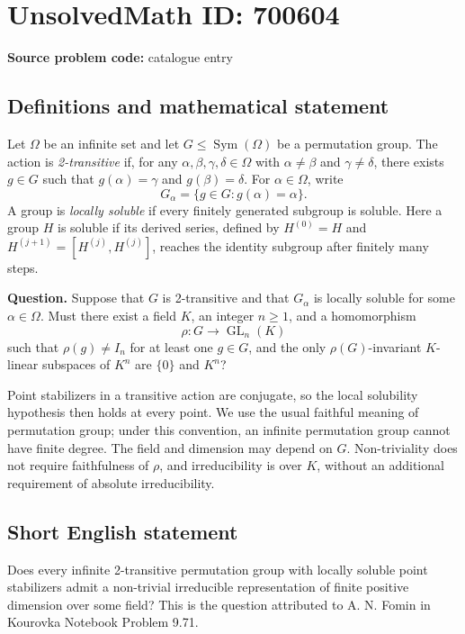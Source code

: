 \documentclass[11pt]{article}
\begin{document}
\section*{UnsolvedMath ID: 700604}
\textbf{Source problem code:} catalogue entry
\subsection{Definitions and mathematical statement}
Let \(\Omega\) be an infinite set and let \(G\leq\operatorname{Sym}(\Omega)\) be a permutation group. The action is \emph{2-transitive} if, for any \(\alpha,\beta,\gamma,\delta\in\Omega\) with \(\alpha\neq\beta\) and \(\gamma\neq\delta\), there exists \(g\in G\) such that \(g(\alpha)=\gamma\) and \(g(\beta)=\delta\). For \(\alpha\in\Omega\), write
\[
G_\alpha=\{g\in G:g(\alpha)=\alpha\}.
\]
A group is \emph{locally soluble} if every finitely generated subgroup is soluble. Here a group \(H\) is soluble if its derived series, defined by \(H^{(0)}=H\) and \(H^{(j+1)}=[H^{(j)},H^{(j)}]\), reaches the identity subgroup after finitely many steps.

\textbf{Question.} Suppose that \(G\) is 2-transitive and that \(G_\alpha\) is locally soluble for some \(\alpha\in\Omega\). Must there exist a field \(K\), an integer \(n\geq1\), and a homomorphism
\[
\rho:G\longrightarrow\operatorname{GL}_n(K)
\]
such that \(\rho(g)\neq I_n\) for at least one \(g\in G\), and the only \(\rho(G)\)-invariant \(K\)-linear subspaces of \(K^n\) are \(\{0\}\) and \(K^n\)?

Point stabilizers in a transitive action are conjugate, so the local solubility hypothesis then holds at every point. We use the usual faithful meaning of permutation group; under this convention, an infinite permutation group cannot have finite degree. The field and dimension may depend on \(G\). Non-triviality does not require faithfulness of \(\rho\), and irreducibility is over \(K\), without an additional requirement of absolute irreducibility.
\subsection{Short English statement}
Does every infinite 2-transitive permutation group with locally soluble point stabilizers admit a non-trivial irreducible representation of finite positive dimension over some field? This is the question attributed to A. N. Fomin in Kourovka Notebook Problem 9.71.
\end{document}
